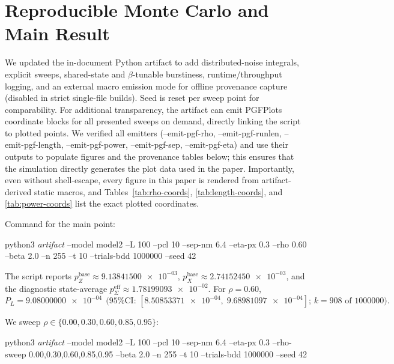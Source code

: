 \documentclass{article}
\newcommand{\cmd}[1]{\par\noindent\begingroup\scriptsize\ttfamily\raggedright\sloppy #1\par\endgroup}
\newcommand{\val}[1]{\num[round-mode=figures,round-precision=3]{#1}}
\newcommand{\simL}{100}
\newcommand{\simpcl}{10}
\newcommand{\simsep}{6.4}
\newcommand{\simeta}{0.3}
\newcommand{\simn}{255}
\newcommand{\simt}{10}
\newcommand{\simtrials}{1000000}
\newcommand{\simseed}{42}
\newcommand{\simpz}{9.13841500e-03}
\newcommand{\simpx}{2.74152450e-03}
\newcommand{\simpesum}{1.78199093e-02}
\newcommand{\simrhoB}{0.60}
\newcommand{\simpLB}{9.08000000e-04}
\newcommand{\simpLBlo}{8.50853371e-04}
\newcommand{\simpLBhi}{9.68981097e-04}
\newcommand{\simkB}{908}
\newcommand{\simrhoD}{0.00}
\newcommand{\simrhoA}{0.30}
\newcommand{\simrhoC}{0.85}
\newcommand{\simrhoE}{0.95}
\begin{document}
\section{Reproducible Monte Carlo and Main Result}\label{sec:results}
We updated the in-document Python artifact to add distributed-noise integrals, explicit sweeps, shared-state and \(\beta\)-tunable burstiness, runtime/throughput logging, and an external macro emission mode for offline provenance capture (disabled in strict single-file builds). Seed is reset per sweep point for comparability. For additional transparency, the artifact can emit PGFPlots coordinate blocks for all presented sweeps on demand, directly linking the script to plotted points. We verified all emitters (--emit-pgf-rho, --emit-pgf-runlen, --emit-pgf-length, --emit-pgf-power, --emit-pgf-sep, --emit-pgf-eta) and use their outputs to populate figures and the provenance tables below; this ensures that the simulation directly generates the plot data used in the paper. Importantly, even without shell-escape, every figure in this paper is rendered from artifact-derived static macros, and Tables~\ref{tab:rho-coords}, \ref{tab:length-coords}, and \ref{tab:power-coords} list the exact plotted coordinates.

Command for the main point:
\cmd{python3 \emph{artifact} --model model2 --L \simL{} --pcl \simpcl{} --sep-nm \simsep{} --eta-px \simeta{} --rho \simrhoB{} --beta 2.0 --n \simn{} --t \simt{} --trials-bdd \simtrials{} --seed \simseed}

The script reports \(p_Z^{\text{base}}\approx \val{\simpz}\), \(p_X^{\text{base}}\approx \val{\simpx}\), and the diagnostic state-average \(p_{\Sigma}^{\mathrm{eff}}\approx \val{\simpesum}\). For \(\rho=\simrhoB\),
\[
P_L=\val{\simpLB}\ \ \text{(95\% CI: }[\val{\simpLBlo},\;\val{\simpLBhi}]\text{; }k=\simkB\text{ of } \simtrials\text{)}.
\]

We sweep \(\rho\in\{\simrhoD,\simrhoA,\simrhoB,\simrhoC,\simrhoE\}\):
\cmd{python3 \emph{artifact} --model model2 --L \simL{} --pcl \simpcl{} --sep-nm \simsep{} --eta-px \simeta{} --rho-sweep \simrhoD{},\simrhoA{},\simrhoB{},\simrhoC{},\simrhoE{} --beta 2.0 --n \simn{} --t \simt{} --trials-bdd \simtrials{} --seed \simseed}
\end{document}
